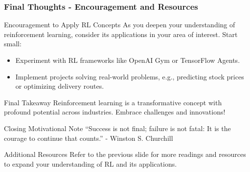\documentclass[aspectratio=169]{beamer}
\begin{document}
\begin{frame}[fragile]
    \frametitle{Final Thoughts - Encouragement and Resources}
    \begin{block}{Encouragement to Apply RL Concepts}
        As you deepen your understanding of reinforcement learning, consider its applications in your area of interest. Start small:
        \begin{itemize}
            \item Experiment with RL frameworks like OpenAI Gym or TensorFlow Agents.
            \item Implement projects solving real-world problems, e.g., predicting stock prices or optimizing delivery routes.
        \end{itemize}
    \end{block}
    
    \begin{block}{Final Takeaway}
        Reinforcement learning is a transformative concept with profound potential across industries. Embrace challenges and innovations!
    \end{block}
    
    \begin{block}{Closing Motivational Note}
        “Success is not final; failure is not fatal: It is the courage to continue that counts.” - Winston S. Churchill
    \end{block}
    
    \begin{block}{Additional Resources}
        Refer to the previous slide for more readings and resources to expand your understanding of RL and its applications.
    \end{block}
\end{frame}
\end{document}
